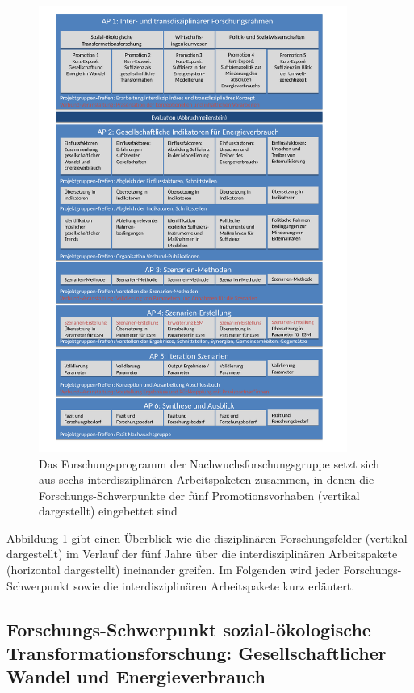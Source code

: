 \documentclass[a4paper,11pt,twoside]{scrartcl}
\begin{document}
\begin{figure}[!h]
    \centering
    \includegraphics[width=0.9\textwidth]{figures/Forschungsarbeit2.pdf}
    \caption{Das Forschungsprogramm der Nachwuchsforschungsgruppe setzt sich aus sechs interdisziplinären Arbeitspaketen zusammen, in denen die Forschungs-Schwerpunkte der fünf  Promotionsvorhaben (vertikal dargestellt) eingebettet sind}
    \label{fig:forschungsprogramm}
\end{figure}

Abbildung \ref{fig:forschungsprogramm} gibt einen Überblick wie die disziplinären Forschungsfelder (vertikal dargestellt) im Verlauf der fünf Jahre über die interdisziplinären Arbeitspakete (horizontal dargestellt) ineinander greifen. Im Folgenden wird jeder Forschungs-Schwerpunkt sowie die interdisziplinären Arbeitspakete kurz erläutert.

\subsection*{Forschungs-Schwerpunkt sozial-ökologische Transformationsforschung: Gesellschaftlicher Wandel und Energieverbrauch}
\end{document}
